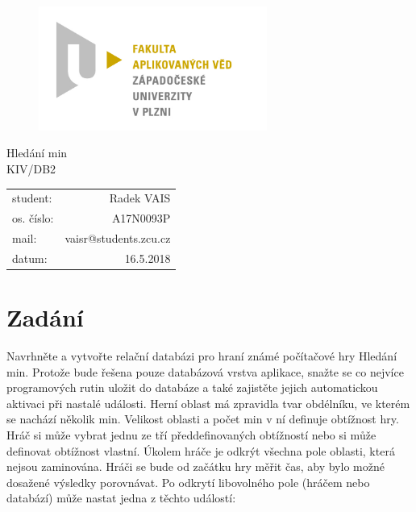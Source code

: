 \documentclass[12pt, a4paper]{article}
\begin{document}
\begin{figure}[h!]
\centering
\includegraphics[bb= 0 0 820 445 , width=75mm]{favlogo.jpg}
\end{figure}

{\centering
{\huge Hledání min}\\[1em]
{\large KIV/DB2}\\[11,5cm]
}

\begin{tabular}{l r}
student: & Radek VAIS\\
os. číslo: & A17N0093P\\
mail: & vaisr@students.zcu.cz\\
datum: & 16.5.2018\\
\end{tabular}

\thispagestyle{empty}
\newpage

\section{Zadání} %

Navrhněte a vytvořte relační databázi pro hraní známé počítačové hry Hledání min. Protože bude řešena pouze databázová vrstva aplikace, snažte se co nejvíce programových rutin uložit do databáze a také zajistěte jejich automatickou aktivaci při nastalé události.
Herní oblast má zpravidla tvar obdélníku, ve kterém se nachází několik min. Velikost oblasti a počet min v ní definuje obtížnost hry. Hráč si může vybrat jednu ze tří předdefinovaných obtížností nebo si může definovat obtížnost vlastní. Úkolem hráče je odkrýt všechna pole oblasti, která nejsou zaminována. Hráči se bude od začátku hry měřit čas, aby bylo možné dosažené výsledky porovnávat. Po odkrytí libovolného pole (hráčem nebo databází) může nastat jedna z těchto událostí:
\end{document}
